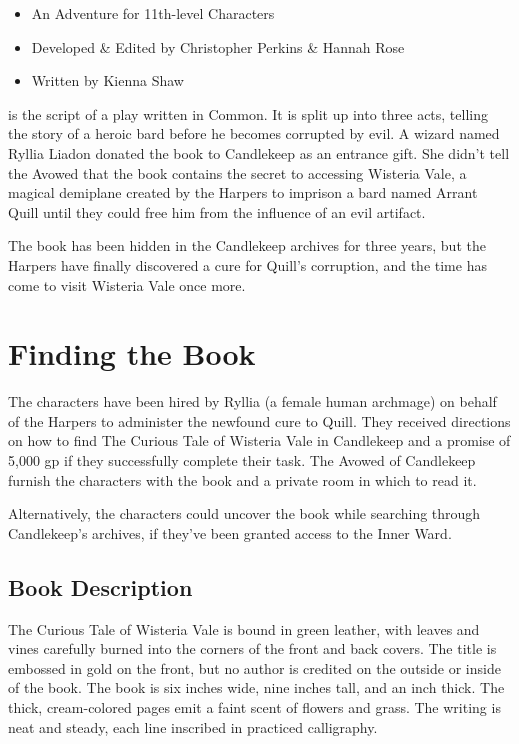 \documentclass[10pt,a4paper,twoside,bg=print,twocolumn,openany,nodeprecatedcode]{dndbook}
\begin{document}
\begin{itemize}
\item An Adventure for 11th-level Characters
\item Developed \& Edited by Christopher Perkins \& Hannah Rose
\item Written by Kienna Shaw
\end{itemize}

 is the script of a play written in Common. It is split up into three acts, telling the story of a heroic bard before he becomes corrupted by evil. A wizard named Ryllia Liadon donated the book to Candlekeep as an entrance gift. She didn't tell the Avowed that the book contains the secret to accessing Wisteria Vale, a magical demiplane created by the Harpers to imprison a bard named Arrant Quill until they could free him from the influence of an evil artifact.


The book has been hidden in the Candlekeep archives for three years, but the Harpers have finally discovered a cure for Quill's corruption, and the time has come to visit Wisteria Vale once more.

\section{Finding the Book}
The characters have been hired by Ryllia (a female human archmage) on behalf of the Harpers to administer the newfound cure to Quill. They received directions on how to find The Curious Tale of Wisteria Vale in Candlekeep and a promise of 5,000 gp if they successfully complete their task. The Avowed of Candlekeep furnish the characters with the book and a private room in which to read it.

Alternatively, the characters could uncover the book while searching through Candlekeep's archives, if they've been granted access to the Inner Ward.

\subsection{Book Description}
The Curious Tale of Wisteria Vale is bound in green leather, with leaves and vines carefully burned into the corners of the front and back covers. The title is embossed in gold on the front, but no author is credited on the outside or inside of the book. The book is six inches wide, nine inches tall, and an inch thick. The thick, cream-colored pages emit a faint scent of flowers and grass. The writing is neat and steady, each line inscribed in practiced calligraphy.
\end{document}
